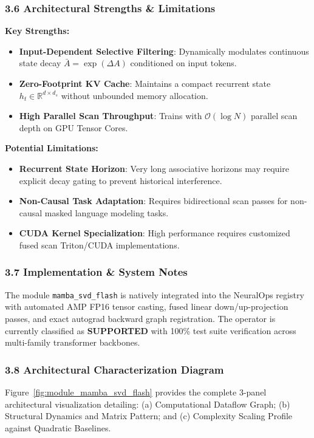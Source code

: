 \subsubsection*{3.6 Architectural Strengths \& Limitations}
\textbf{Key Strengths:}
\begin{itemize}
    \item \textbf{Input-Dependent Selective Filtering}: Dynamically modulates continuous state decay $\bar{A} = \exp(\Delta A)$ conditioned on input tokens.
    \item \textbf{Zero-Footprint KV Cache}: Maintains a compact recurrent state $h_t \in \mathbb{R}^{d \times d_s}$ without unbounded memory allocation.
    \item \textbf{High Parallel Scan Throughput}: Trains with $\mathcal{O}(\log N)$ parallel scan depth on GPU Tensor Cores.
\end{itemize}

\textbf{Potential Limitations:}
\begin{itemize}
    \item \textbf{Recurrent State Horizon}: Very long associative horizons may require explicit decay gating to prevent historical interference.
    \item \textbf{Non-Causal Task Adaptation}: Requires bidirectional scan passes for non-causal masked language modeling tasks.
    \item \textbf{CUDA Kernel Specialization}: High performance requires customized fused scan Triton/CUDA implementations.
\end{itemize}

\subsubsection*{3.7 Implementation \& System Notes}
The module \texttt{mamba\_svd\_flash} is natively integrated into the NeuralOps registry with automated AMP FP16 tensor casting, fused linear down/up-projection passes, and exact autograd backward graph registration. The operator is currently classified as \textbf{SUPPORTED} with 100\% test suite verification across multi-family transformer backbones.

\subsubsection*{3.8 Architectural Characterization Diagram}
Figure~\ref{fig:module_mamba_svd_flash} provides the complete 3-panel architectural visualization detailing: (a) Computational Dataflow Graph; (b) Structural Dynamics and Matrix Pattern; and (c) Complexity Scaling Profile against Quadratic Baselines.

